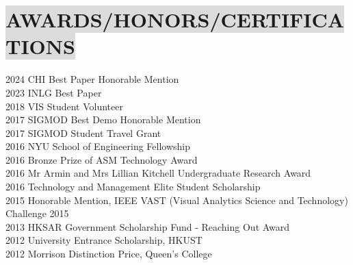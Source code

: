 \section*{
    \colorbox{gainsboro}{AWARDS/HONORS/CERTIFICATIONS}
}

2024 \hspace{9mm}
CHI Best Paper Honorable Mention
\\
2023 \hspace{9mm}
INLG Best Paper
\\
2018 \hspace{9mm} 
VIS Student Volunteer
\\
2017 \hspace{9mm} 
SIGMOD Best Demo Honorable Mention
\\
2017 \hspace{9mm} 
SIGMOD Student Travel Grant
\\
2016 \hspace{9mm} 
NYU School of Engineering Fellowship
\\
2016 \hspace{9mm} 
Bronze Prize of ASM Technology Award
\\
2016 \hspace{9mm} 
Mr Armin and Mrs Lillian Kitchell Undergraduate Research Award
\\
2016 \hspace{9mm} 
Technology and Management Elite Student Scholarship
\\
2015 \hspace{9mm} 
Honorable Mention, IEEE VAST (Visual Analytics Science and Technology) Challenge 2015
\\
2013 \hspace{9mm} 
HKSAR Government Scholarship Fund - Reaching Out Award
\\
2012 \hspace{9mm}
University Entrance Scholarship, HKUST
\\
2012 \hspace{9mm}
Morrison Distinction Price, Queen's College
